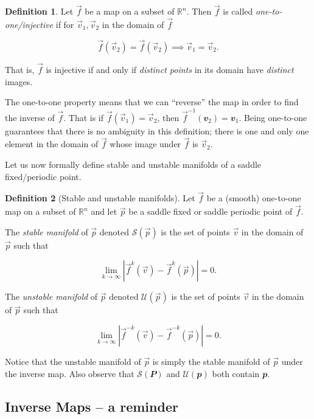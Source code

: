 \documentclass[
  a4paper,
  oneside,
  final]{krantz}
\newcommand{\R}{\mathbb{R}}
\renewcommand{\v}[1]{{\mathbfit{#1}}}
\newcommand{\stab}[1]{\mathcal{S}(#1)}
\newcommand{\unstab}[1]{\mathcal{U}(#1)}
\theoremstyle{definition}
\newtheorem{definition}{Definition}[chapter]
\theoremstyle{definition}
\theoremstyle{definition}
\theoremstyle{definition}
\theoremstyle{remark}
\begin{document}
\begin{definition}
\protect\hypertarget{def:onetoone}{}\label{def:onetoone}Let \(\vec{f}\) be a map on a subset of \(\R^{n}\). Then \(\vec{f}\) is called \emph{one-to-one/injective} if for \(\vec{v}_1, \vec{v}_2\) in the domain of \(\vec{f}\)

\[ \vec{f}(\vec{v}_2) = \vec{f}(\vec{v}_2) \implies \vec{v}_1 = \vec{v}_2.\]

That is, \(\vec{f}\) is injective if and only if \emph{distinct points} in its domain have \emph{distinct} images.
\end{definition}

The one-to-one property means that we can ``reverse'' the map in order to find the inverse of \(\vec{f}\). That is if \(\vec{f}(\vec{v}_1) = \vec{v}_2\), then \(\vec{f}^{-1}(\v{v}_2) = \v{v}_1\). Being one-to-one guarantees that there is no ambiguity in this definition; there is one and only one element in the domain of \(\vec{f}\) whose image under \(\vec{f}\) is \(\vec{v}_2\).

Let us now formally define stable and unstable manifolds of a saddle fixed/periodic point.

\begin{definition}[Stable and unstable manifolds]
\protect\hypertarget{def:stableunstablemanifolds}{}\label{def:stableunstablemanifolds}Let \(\vec{f}\) be a (smooth) one-to-one map on a subset of \(\R^{n}\) and let \(\vec{p}\) be a saddle fixed or saddle periodic point of \(\vec{f}\).

The \emph{stable manifold} of \(\vec{p}\) denoted \(\stab{\vec{p}}\) is the set of points \(\vec{v}\) in the domain of \(\vec{p}\) such that

\[ \lim_{k \to \infty} |\vec{f}^{k}(\vec{v}) - \vec{f}^{k}(\vec{p})| = 0. \]

The \emph{unstable manifold} of \(\vec{p}\) denoted \(\unstab{\vec{p}}\) is the set of points \(\vec{v}\) in the domain of \(\vec{p}\) such that

\[ \lim_{k \to \infty} |\vec{f}^{-k}(\vec{v}) - \vec{f}^{-k}(\vec{p})| = 0. \]
\end{definition}

Notice that the unstable manifold of \(\vec{p}\) is simply the stable manifold of \(\vec{p}\) under the inverse map. Also observe that \(\stab{\v{P}}\) and \(\unstab{\v{p}}\) both contain \(\v{p}\).

\hypertarget{recapinversemaps}{%
\subsection{Inverse Maps -- a reminder}\label{recapinversemaps}}
\end{document}
